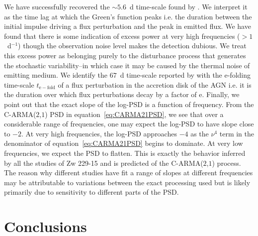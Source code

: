 \documentclass[a4paper,fleqn,usenatbib]{mnras}
\begin{document}
We have successfully recovered the $\sim 5.6$~d time-scale found by \citet{Edelson14}. We interpret it as the time lag at which the Green's function peaks i.e. the duration between the initial impulse driving a flux perturbation and the peak in emitted flux. We have found that there is some indication of excess power at very high frequencies ($> 1$~d$^{-1}$) though the observation noise level makes the detection dubious. We treat this excess power as belonging purely to the disturbance process that generates the stochastic variability--in which case it may be caused by the thermal noise of emitting medium. We identify the $67$~d time-scale reported by \citet{CariniWilliamsAAS} with the e-folding time-scale $t_{\mathrm{e-fold}}$ of a flux perturbation in the accretion disk of the AGN i.e. it is the duration over which flux perturbations decay by a factor of $\mathrm{e}$. Finally, we point out that the exact slope of the log-PSD is a function of frequency. From the C-ARMA($2$,$1$) PSD in equation~\eqref{eq:CARMA21PSD}, we see that over a considerable range of frequencies, one may expect the log-PSD to have slope close to $-2$. At very high frequencies, the log-PSD approaches $-4$ as the $\nu^{4}$ term in the denominator of equation~\eqref{eq:CARMA21PSD} begins to dominate. At very low frequencies, we expect the PSD to flatten. This is exactly the behavior inferred by all the studies of Zw 229-15 and is predicted of the C-ARMA($2$,$1$) process. The reason why different studies have fit a range of slopes at different frequencies may be attributable to variations between the exact processing used but is likely primarily due to sensitivity to different parts of the PSD.



\section[Conclusion]{Conclusions}\label{sec:Conclusions}
\end{document}
